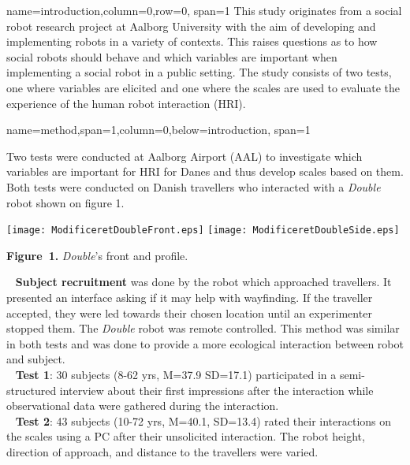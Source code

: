 \documentclass[paperwidth=118cm,paperheight=84cm,landscape,fontscale=0.2941]{baposter}
\begin{document}
\begin{poster}
{name=introduction,column=0,row=0, span=1}
{\parskip 5pt   
This study originates from a social robot research project at Aalborg University with the aim of developing and implementing robots in a variety of contexts. This raises questions as to how social robots should behave and which variables are important when implementing a social robot in a public setting. The study consists of two tests, one where variables are elicited and one where the scales are used to evaluate the experience of the human robot interaction (HRI). %
}

{name=method,span=1,column=0,below=introduction, span=1}
{\parskip 5pt 
Two tests were conducted at Aalborg Airport (AAL) to investigate which variables are important for HRI for Danes and thus develop scales based on them. Both tests were conducted on Danish travellers who interacted with a \textit{Double} robot shown on figure 1.\\
\vspace{-11pt}  

\begin{center}
\texttt{[image: ModificeretDoubleFront.eps]}
\texttt{[image: ModificeretDoubleSide.eps]}

\textbf{Figure~1. }\footnotesize{\textit{Double}'s front and profile.}
\end{center}
\vspace{-15pt}  

\textbullet~ \textbf{Subject recruitment} was done by the robot which approached travellers. It presented an interface asking if it may help with wayfinding. If the traveller accepted, they were led towards their chosen location until an experimenter stopped them. The \textit{Double} robot was remote controlled. This method was similar in both tests and was done to provide a more ecological interaction between robot and subject.\\
\textbullet~ \textbf{Test 1}: 30 subjects (8-62 yrs, M=37.9 SD=17.1) participated in a semi-structured interview about their first impressions after the interaction while observational data were gathered during the interaction. \\
\textbullet~ \textbf{Test 2}: 43 subjects (10-72 yrs, M=40.1, SD=13.4) rated their interactions on the scales using a PC after their unsolicited interaction. The robot height, direction of approach, and distance to the travellers were varied.

}
\end{poster}
\end{document}

